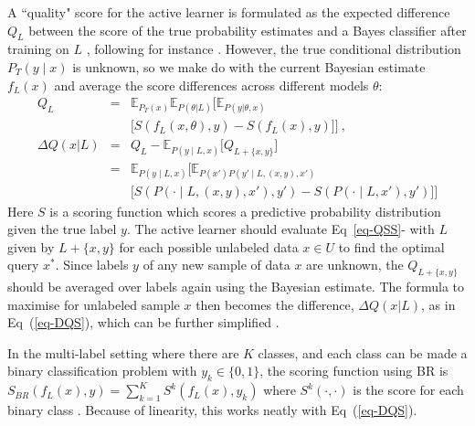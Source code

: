 \documentclass[letterpaper]{article} %
\begin{document}
A ``quality"  score for the active learner is formulated
as the expected difference $Q_L$
between the score of the true probability estimates and a Bayes classifier after training on $L$ \citep{TanDuBun-IEEEPAMI23}, following for instance \citet[Sct.~4.1]{pmlr-v20-hung11}.
However, the  true conditional distribution $P_T(y\mid x)$ is unknown, so we make do with the current Bayesian estimate $f_L(x)$ and average the score differences across different models $\theta$:
{\scriptsize
\begin{eqnarray}
    Q_L
    &=&  \mathbb{E}_{P_T(x)}
    \mathbb{E}_{P(\theta|L)}  \Big[
    \mathbb{E}_{P(y|\theta,x)}  \nonumber\\
    && \big[
            S(f_L(x,\theta),y) - S(f_L(x),y)
        \big] \Big] ~, \label{eq-QSS}\\
        \Delta{Q}(x|L)
        &=& Q_{L} - \mathbb{E}_{ P(y \mid L,x) }\big[ Q_{L+\{x,y\}}   \big]
        \nonumber\\%
    &=&\mathbb{E}_{P(y\mid L, x)}
    \bigg[
        \mathbb{E}_{P(x') P (y' \mid L, (x, y), x')}
    \nonumber\\
    &&
        \big[
            S(P(\cdot \mid L, (x, y), x'), y')
           - S(P(\cdot \mid L, x'), y')
        \big]
    \bigg] \label{eq-DQS}
\end{eqnarray}}
\noindent
Here $S$ is a scoring function which
scores a predictive probability distribution given the true label $y$. The active learner should evaluate Eq~\eqref{eq-QSS}- with $L$ given by ${L+ \{x,y\}}$ for each possible unlabeled data $x \in U$ to find the optimal query  $x^*$.
Since labels $y$ of any new sample of data $x$ are unknown,
the $Q_{L+ \{x,y\}}$ should be averaged over labels again using the Bayesian estimate.  The formula to maximise for unlabeled sample $x$ then becomes the difference,
$\Delta{Q}(x|L)$, as in Eq~(\ref{eq-DQS}),
which can be further simplified \cite[Equation 6]{TanDuBun-IEEEPAMI23}.

 In the multi-label setting where there are $K$ classes, and each class can be made a binary classification problem with $y_{k} \in \{0,1 \}$, the scoring function using BR is
  $S_{BR}( f_L(x),y) =\sum_{k=1}^{K}S^k(f_L(x),y_k)$
where $S^k(\cdot,\cdot)$ is the score for each binary class \cite{dawid2014theory}.  Because of linearity, this works neatly with Eq~(\ref{eq-DQS}).
\end{document}
